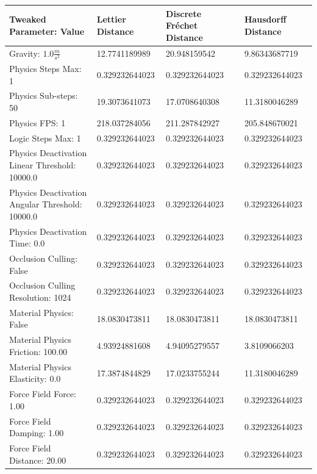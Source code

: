 \begin{table}[htbp]
\centering
\footnotesize
\def\arraystretch{1.1}
\begin{tabular}{ | l || l | l | l | }
\hline
\rowcolor{lightgray}
Tweaked Parameter: Value & Lettier Distance & Discrete Fr{\'e}chet Distance & Hausdorff Distance \\ \hline
Gravity: $1.0\frac{m}{s^2}$ & 12.7741189989 & 20.948159542 & 9.86343687719 \\ \hline
\rowcolor{lightblue}
Physics Steps Max: 1 & 0.329232644023 & 0.329232644023 & 0.329232644023 \\ \hline
Physics Sub-steps: 50 & 19.3073641073 & 17.0708640308 & 11.3180046289 \\ \hline
Physics FPS: 1 & 218.037284056 & 211.287842927 & 205.848670021 \\ \hline
\rowcolor{lightblue}
Logic Steps Max: 1 & 0.329232644023 & 0.329232644023 & 0.329232644023 \\ \hline
\rowcolor{lightblue}
Physics Deactivation Linear Threshold: 10000.0 & 0.329232644023 & 0.329232644023 & 0.329232644023 \\ \hline
\rowcolor{lightblue}
Physics Deactivation Angular Threshold: 10000.0 & 0.329232644023 & 0.329232644023 & 0.329232644023 \\ \hline
\rowcolor{lightblue}
Physics Deactivation Time: 0.0 & 0.329232644023 & 0.329232644023 & 0.329232644023 \\ \hline
\rowcolor{lightblue}
Occlusion Culling: False & 0.329232644023 & 0.329232644023 & 0.329232644023 \\ \hline
\rowcolor{lightblue}
Occlusion Culling Resolution: 1024 & 0.329232644023  & 0.329232644023  & 0.329232644023 \\ \hline
Material Physics: False & 18.0830473811 & 18.0830473811  & 18.0830473811 \\ \hline
Material Physics Friction: 100.00 & 4.93924881608  & 4.94095279557  & 3.8109066203 \\ \hline
Material Physics Elasticity: 0.0 & 17.3874844829  & 17.0233755244  & 11.3180046289 \\ \hline
\rowcolor{lightblue}
Force Field Force: 1.00 & 0.329232644023  & 0.329232644023  & 0.329232644023 \\ \hline
\rowcolor{lightblue}
Force Field Damping: 1.00 & 0.329232644023  & 0.329232644023  & 0.329232644023 \\ \hline
\rowcolor{lightblue}
Force Field Distance: 20.00 & 0.329232644023  & 0.329232644023  & 0.329232644023 \\ \hline

\end{tabular}
\end{table}
